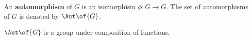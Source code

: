 \begin{definition}[an automorphism]
    An \textbf{automorphism} of $G$ is an isomorphism $\phi: G \to G$. The set of automorphisms of $G$ is denoted by $\Aut\of{G}$.
\end{definition}

\begin{theorem}
    $\Aut\of{G}$ is a group under composition of functions.
\end{theorem}